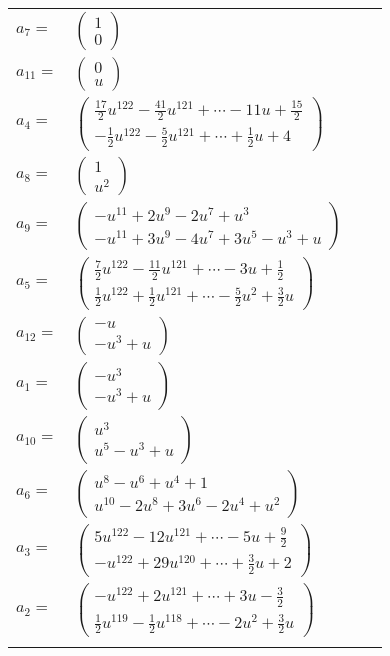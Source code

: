 \documentclass[1p]{elsarticle_modified}
\theoremstyle{definition}
\begin{document}
\begin{tabular}{m{7pt} m{180pt} m{7pt} m{180pt} }
\flushright $a_{7}=$&$\begin{pmatrix}1\\0\end{pmatrix}$ \\
\flushright $a_{11}=$&$\begin{pmatrix}0\\u\end{pmatrix}$ \\
\flushright $a_{4}=$&$\begin{pmatrix}\frac{17}{2} u^{122}-\frac{41}{2} u^{121}+\cdots-11 u+\frac{15}{2}\\-\frac{1}{2} u^{122}-\frac{5}{2} u^{121}+\cdots+\frac{1}{2} u+4\end{pmatrix}$ \\
\flushright $a_{8}=$&$\begin{pmatrix}1\\u^2\end{pmatrix}$ \\
\flushright $a_{9}=$&$\begin{pmatrix}- u^{11}+2 u^9-2 u^7+u^3\\- u^{11}+3 u^9-4 u^7+3 u^5- u^3+u\end{pmatrix}$ \\
\flushright $a_{5}=$&$\begin{pmatrix}\frac{7}{2} u^{122}-\frac{11}{2} u^{121}+\cdots-3 u+\frac{1}{2}\\\frac{1}{2} u^{122}+\frac{1}{2} u^{121}+\cdots-\frac{5}{2} u^2+\frac{3}{2} u\end{pmatrix}$ \\
\flushright $a_{12}=$&$\begin{pmatrix}- u\\- u^3+u\end{pmatrix}$ \\
\flushright $a_{1}=$&$\begin{pmatrix}- u^3\\- u^3+u\end{pmatrix}$ \\
\flushright $a_{10}=$&$\begin{pmatrix}u^3\\u^5- u^3+u\end{pmatrix}$ \\
\flushright $a_{6}=$&$\begin{pmatrix}u^8- u^6+u^4+1\\u^{10}-2 u^8+3 u^6-2 u^4+u^2\end{pmatrix}$ \\
\flushright $a_{3}=$&$\begin{pmatrix}5 u^{122}-12 u^{121}+\cdots-5 u+\frac{9}{2}\\- u^{122}+29 u^{120}+\cdots+\frac{3}{2} u+2\end{pmatrix}$ \\
\flushright $a_{2}=$&$\begin{pmatrix}- u^{122}+2 u^{121}+\cdots+3 u-\frac{3}{2}\\\frac{1}{2} u^{119}-\frac{1}{2} u^{118}+\cdots-2 u^2+\frac{3}{2} u\end{pmatrix}$\\&\end{tabular}
\end{document}
